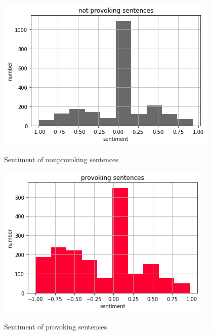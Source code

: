 \documentclass[11pt,letterpaper]{article}
\begin{document}
\begin{figure}[hbt!]
  \centering
  \begin{minipage}[b]{0.45\textwidth}
    \includegraphics[width=\textwidth]{images/senti_nonprov.png}
    \label{fig:senti_nonprov}
    \caption{Sentiment of nonprovoking sentences}
  \end{minipage}
  \hfill
  \begin{minipage}[b]{0.45\textwidth}
    \includegraphics[width=\textwidth]{images/senti_prov.png}
    \label{fig:senti_prov}
    \caption{Sentiment of provoking sentences}
  \end{minipage}
\end{figure}

\end{document}
